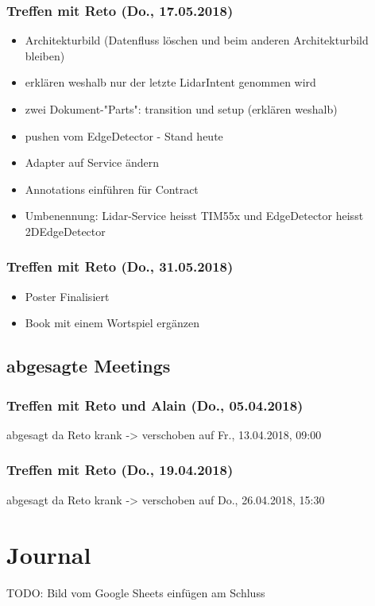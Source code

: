\subsubsection{Treffen mit Reto (Do., 17.05.2018)}
\begin{itemize}
	\item Architekturbild (Datenfluss löschen und beim anderen Architekturbild bleiben)
	\item erklären weshalb nur der letzte LidarIntent genommen wird
	\item zwei Dokument-"Parts": transition und setup (erklären weshalb)
	\item pushen vom EdgeDetector - Stand heute
	\item Adapter auf Service ändern
	\item Annotations einführen für Contract
	\item Umbenennung: Lidar-Service heisst TIM55x und EdgeDetector heisst 2DEdgeDetector
\end{itemize}

\subsubsection{Treffen mit Reto (Do., 31.05.2018)}
\begin{itemize}
	\item Poster Finalisiert
	\item Book mit einem Wortspiel ergänzen
\end{itemize}

\subsection{abgesagte Meetings}
\subsubsection{Treffen mit Reto und Alain (Do., 05.04.2018)}
abgesagt da Reto krank -> verschoben auf Fr., 13.04.2018, 09:00

\subsubsection{Treffen mit Reto (Do., 19.04.2018)}
abgesagt da Reto krank -> verschoben auf Do., 26.04.2018, 15:30

\section{Journal}
TODO: Bild vom Google Sheets einfügen am Schluss